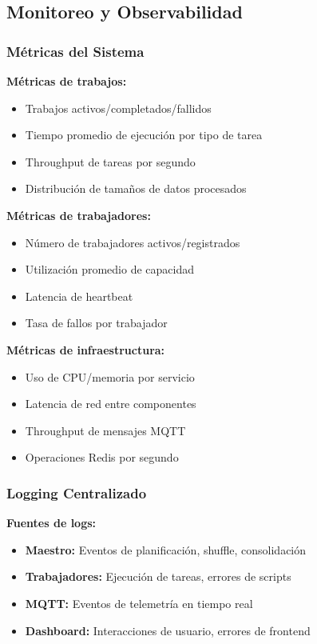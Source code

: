 \subsection{Monitoreo y Observabilidad}

\subsubsection{Métricas del Sistema}

\textbf{Métricas de trabajos:}
\begin{itemize}
    \item Trabajos activos/completados/fallidos
    \item Tiempo promedio de ejecución por tipo de tarea
    \item Throughput de tareas por segundo
    \item Distribución de tamaños de datos procesados
\end{itemize}

\textbf{Métricas de trabajadores:}
\begin{itemize}
    \item Número de trabajadores activos/registrados
    \item Utilización promedio de capacidad
    \item Latencia de heartbeat
    \item Tasa de fallos por trabajador
\end{itemize}

\textbf{Métricas de infraestructura:}
\begin{itemize}
    \item Uso de CPU/memoria por servicio
    \item Latencia de red entre componentes
    \item Throughput de mensajes MQTT
    \item Operaciones Redis por segundo
\end{itemize}

\subsubsection{Logging Centralizado}

\textbf{Fuentes de logs:}
\begin{itemize}
    \item \textbf{Maestro:} Eventos de planificación, shuffle, consolidación
    \item \textbf{Trabajadores:} Ejecución de tareas, errores de scripts
    \item \textbf{MQTT:} Eventos de telemetría en tiempo real
    \item \textbf{Dashboard:} Interacciones de usuario, errores de frontend
\end{itemize}

